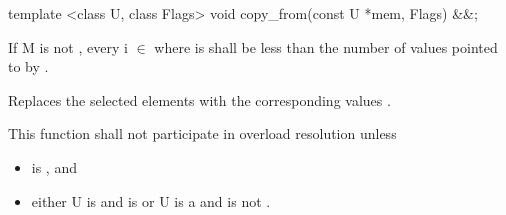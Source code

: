 \begin{itemdecl}
template <class U, class Flags> void copy_from(const U *mem, Flags) &&;
\end{itemdecl}
\begin{itemdescr}
  If \type M is not \bool, every i $\in$ \code{[0, M::size())} where  is \true shall be less than the number of values pointed to by .

  \pnum\effects Replaces the selected elements with the corresponding values  .

  \pnum\remarks This function shall not participate in overload resolution unless
  \begin{itemize}
      \item {} is \true, and
      \item either \type U is \bool and  is \bool or
          \type U is a \realArithmeticType and  is not \bool.
  \end{itemize}
\end{itemdescr}


